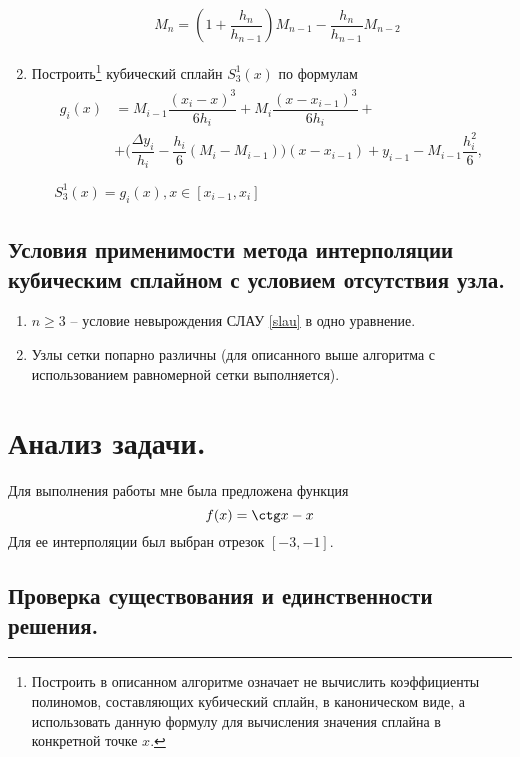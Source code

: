 \documentclass[a4paper, 12pt]{article}
\begin{document}
\begin{enumerate}
\begin{equation}
\begin{aligned}
				&M_n=(1+\dfrac{h_n}{h_{n-1}})M_{n-1}-\dfrac{h_n}{h_{n-1}}M_{n-2}
			\end{aligned}
		\end{equation}
		\item Построить\footnote{Построить в описанном алгоритме означает не вычислить коэффициенты полиномов, составляющих кубический сплайн, в каноническом виде, а использовать данную формулу для вычисления значения сплайна в конкретной точке $x$.} кубический сплайн $S_3^1(x)$ по формулам
		\begin{equation}
			\begin{gathered}
				\begin{aligned}
					g_i(x)&=M_{i-1}\dfrac{(x_i-x)^3}{6h_i}+M_{i}\dfrac{(x-x_{i-1})^3}{6h_i}+\\&+\bigg(\dfrac{\Delta y_i}{h_i}-\dfrac{h_i}{6}(M_i-M_{i-1})\bigg)(x-x_{i-1})+y_{i-1}-M_{i-1}\dfrac{h_i^2}{6},\\
				\end{aligned} \\
				S_3^1(x)=g_i(x), x\in[x_{i-1},x_i]
			\end{gathered}
		\end{equation}	
		
	\end{enumerate}

	\subsection{Условия применимости метода интерполяции кубическим сплайном с условием отсутствия узла.}
	
	\begin{enumerate}
		\item $n \geq 3$ -- условие невырождения СЛАУ \eqref{slau} в одно уравнение.
		\item Узлы сетки попарно различны (для описанного выше алгоритма с использованием равномерной сетки выполняется).
	\end{enumerate}

	\section{Анализ задачи.}
	
	Для выполнения работы мне была предложена функция
	\begin{equation}
				f(x)=\ctg x - x
	\end{equation}
	Для ее интерполяции был выбран отрезок $[-3,-1]$.
	
	\subsection{Проверка существования и единственности решения.}
	
\end{document}
